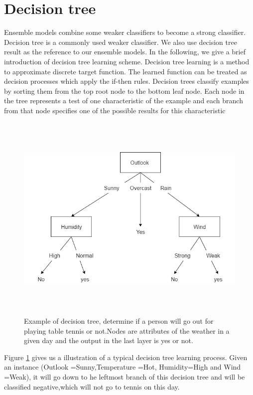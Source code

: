 \section{Decision tree}
Ensemble models combine some weaker classifiers to become a strong classifier. Decision tree is a commonly used weaker classifier. We also use decision tree result as the reference to our ensemble models. In the following, we give a brief introduction of decision tree learning scheme.
Decision tree learning is a method to approximate discrete target function. The learned function can be treated as decision processes which apply the if-then rules.
Decision trees classify examples by sorting them from the top root node to the bottom leaf node. Each node in the tree represents a test of one characteristic of the example and each branch from that node specifies one of the possible results for this characteristic
\begin{figure}[hbtp]
	\begin{center}
		\includegraphics[width=5in,height=4in]{figures/dt_example.png}
	\end{center}
	\caption{Example of decision tree, determine if a person will go out for playing table tennis or not.Nodes are attributes of the weather in a given day and the output in the last layer is yes or not. } \label{fig:dt_example}
\end{figure}    

Figure \ref{fig:dt_example} gives us a illustration of a typical decision tree learning process. Given an instance (Outlook =Sunny,Temperature =Hot, Humidity=High and Wind =Weak), it will go down to he leftmost branch of this decision tree and will be classified negative,which will not go to tennis on this day.  

